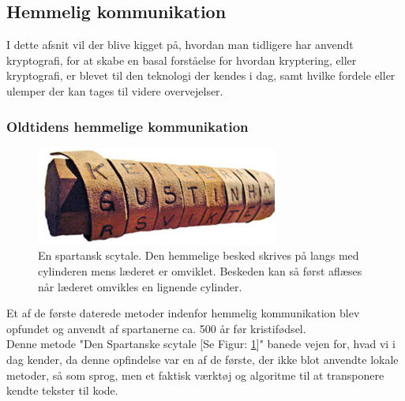 \subsection{Hemmelig kommunikation}
I dette afsnit vil der blive kigget på, hvordan man tidligere har anvendt kryptografi, for at skabe en basal forståelse for hvordan kryptering, eller kryptografi, er blevet til den teknologi der kendes i dag, samt hvilke fordele eller ulemper der kan tages til videre overvejelser.
\subsubsection{Oldtidens hemmelige kommunikation}
\begin{figure}
    \vspace{-30pt}
    \begin{center}
        \includegraphics[width=0.75\linewidth]{Projectdoc/Problemanalyse/Illustrationer/scytale.jpg}
    \end{center}
    \caption{En spartansk scytale. Den hemmelige besked skrives på langs med cylinderen mens læderet er omviklet. Beskeden kan så først aflæses når læderet omvikles en lignende cylinder.}
    \vspace{-30pt}
    \label{fig:scytale}
\end{figure}
Et af de første daterede metoder indenfor hemmelig kommunikation blev opfundet og anvendt af spartanerne ca. 500 år før kristifødsel. \\
Denne metode "Den Spartanske scytale [Se Figur: \ref{fig:scytale}]" banede vejen for, hvad vi i dag kender, da denne opfindelse var en af de første, der ikke blot anvendte lokale metoder, så som sprog, men et faktisk værktøj og algoritme til at transponere kendte tekster til kode.\cite{PastCryptography}

